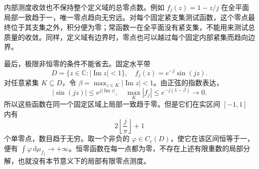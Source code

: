 内部测度收敛也不保持整个定义域的总零点数。例如 \(f_j(z)=1-z/j\) 在全平面局部一致趋于一，唯一零点趋向无穷远。对每个固定紧支集测试函数，这个零点最终位于其支集之外，积分便为零；常函数一在全平面没有紧支集，不能用来测试总质量的收敛。同样，定义域有边界时，零点也可以越过每个固定内部紧集而趋向边界。

\ProseParagraphBreak

最后，极限非恒零的条件不能省去。固定水平带
\[
 D=\{z\in\mathbb C:|\operatorname{Im}z|<1\},\quad
 f_j(z)=e^{-j}\sin(jz).
\]
对任意紧集 \(K\subseteq D\)，令 \(\beta=\max_{z\in K}|\operatorname{Im}z|<1\)。由正弦的指数表达，
\[
 |\sin(jz)|\le e^{j|\operatorname{Im}z|},\quad
 \max_K|f_j|\le e^{-j(1-\beta)}\longrightarrow0.
\]
所以这些函数在同一个固定区域上局部一致趋于零。但是它们在实区间 \([-1,1]\) 内有
\[
 2\left\lfloor\frac j\pi\right\rfloor+1
\]
个单零点，数目趋于无穷。取一个非负的 \(\varphi\in C_c(D)\)，使它在该区间恒等于一，便有 \(\int\varphi\,\mathrm d\mu_{f_j}\to+\infty\)。恒零函数在每一点都为零，不存在上述有限重数的局部分解，也就没有本节意义下的局部有限零点测度。
